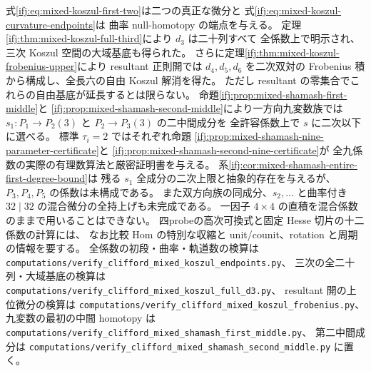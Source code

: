 



\begin{remark}[構成の到達範囲]
式\eqref{ifj:eq:mixed-koszul-first-two}は二つの真正な微分と
式\eqref{ifj:eq:mixed-koszul-curvature-endpoints}は
曲率 null-homotopy の端点を与える。
定理\ref{ifj:thm:mixed-koszul-full-third}により $d_3$ は二十列すべて
全係数上で明示され、三次 Koszul 空間の大域基底も得られた。
さらに定理\ref{ifj:thm:mixed-koszul-frobenius-upper}により
resultant 正則開では $d_4,d_5,d_6$ を二次双対の
Frobenius 積から構成し、全長六の自由 Koszul 解消を得た。
ただし resultant の零集合でこれらの自由基底が延長するとは限らない。
命題\ref{ifj:prop:mixed-shamash-first-middle}と
\ref{ifj:prop:mixed-shamash-second-middle}により一方向九変数族では
$s_1:P_1\to P_2(3)$ と $P_2\to P_3(3)$ の二中間成分を
全許容係数上で $s$ に二次以下に選べる。
標準 $\tau_i=2$ ではそれぞれ命題
\ref{ifj:prop:mixed-shamash-nine-parameter-certificate}と
\ref{ifj:prop:mixed-shamash-second-nine-certificate}が
全九係数の実際の有理数算法と厳密証明書を与える。
系\ref{ifj:cor:mixed-shamash-entire-first-degree-bound}は
残る $s_1$ 全成分の二次上限と抽象的存在を与えるが、
$P_3,P_4,P_5$ の係数は未構成である。
また双方向族の同成分、$s_2,\ldots$ と曲率付き
$32\mid32$ の混合微分の全持上げも未完成である。
一因子 $4\times4$ の直積を混合係数のままで用いることはできない。
四probeの高次可換式と固定 Hesse 切片の十二係数の計算には、
なお比較 Hom の特別な収縮と unit/counit、rotation と周期の情報を要する。
全係数の初段・曲率・軌道数の検算は
\texttt{computations/verify\_clifford\_mixed\_koszul\_endpoints.py}、
三次の全二十列・大域基底の検算は
\texttt{computations/verify\_clifford\_mixed\_koszul\_full\_d3.py}、
resultant 開の上位微分の検算は
\texttt{computations/verify\_clifford\_mixed\_koszul\_frobenius.py}、
九変数の最初の中間 homotopy は
\texttt{computations/verify\_clifford\_mixed\_shamash\_first\_middle.py}、
第二中間成分は
\texttt{computations/verify\_clifford\_mixed\_shamash\_second\_middle.py}
に置く。
\end{remark}
